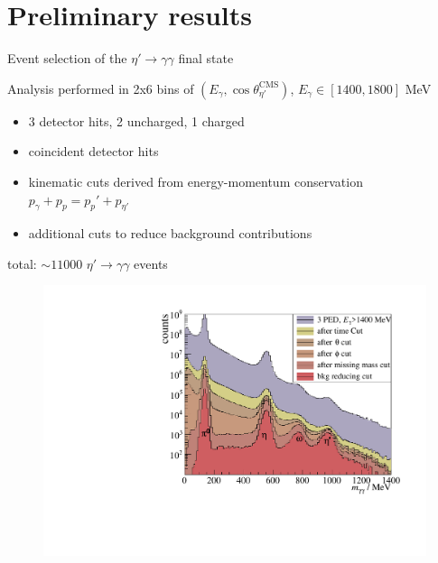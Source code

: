 \documentclass[11pt,aspectratio=169,dvipsnames]{beamer}
\begin{document}
\section{Preliminary results}
\begin{frame}{Event selection of the $\eta'\to\gamma\gamma$ final state}


	\begin{minipage}{0.49\linewidth}
	Analysis performed in 2x6 bins of $(E_\gamma,\cos\theta_{\eta'}^\text{CMS})$, $E_\gamma\in[1400,1800]$ MeV
	\begin{itemize}
		
		\item 3 detector hits, 2 uncharged, 1 charged
		\item coincident detector hits
		\item kinematic cuts derived from energy-momentum conservation $p_\gamma + p_p = p_p'+p_{\eta'}$
		\item additional cuts to reduce background contributions
	\end{itemize}
total: $\sim 11000$ $\eta'\to\gamma\gamma$ events
		\end{minipage}
	\begin{minipage}{.5\linewidth}
		\begin{figure}
			\centering
			\includegraphics[width=1.05\linewidth]{figs/inv_mass_pretty.pdf}
		\end{figure}
	\end{minipage}




\end{frame}
\end{document}

